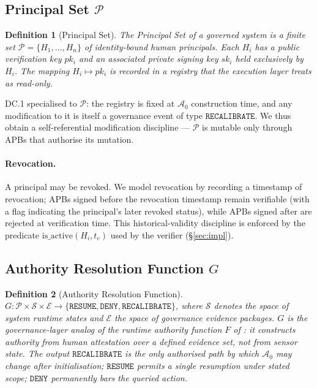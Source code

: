 \documentclass[11pt]{article}
\newtheorem{definition}{Definition}[section]
\newcommand{\Azero}{\mathcal{A}_0}
\newcommand{\RESUME}{\texttt{RESUME}}
\newcommand{\DENY}{\texttt{DENY}}
\newcommand{\RECAL}{\texttt{RECALIBRATE}}
\newcommand{\Pset}{\mathcal{P}}
\newcommand{\Hi}{H_i}
\newcommand{\ski}{sk_i}
\newcommand{\pki}{pk_i}
\begin{document}
\subsection{Principal Set $\Pset$}
\label{sec:principals}

\begin{definition}[Principal Set]
\label{def:principals}
The \emph{Principal Set} of a governed system is a finite set
$\Pset = \{H_1, \ldots, H_n\}$ of identity-bound human principals.
Each $\Hi$ has a public verification key $\pki$ and an associated
private signing key $\ski$ held exclusively by $\Hi$. The mapping
$H_i \mapsto \pki$ is recorded in a registry that the execution layer
treats as read-only.
\end{definition}

DC.1 specialised to $\Pset$: the registry is fixed at $\Azero$
construction time, and any modification to it is itself a governance
event of type $\RECAL$. We thus obtain a self-referential modification
discipline --- $\Pset$ is mutable only through APBs that authorise
its mutation.

\paragraph{Revocation.}
A principal may be revoked. We model revocation by recording a
timestamp of revocation; APBs signed before the revocation timestamp
remain verifiable (with a flag indicating the principal's later
revoked status), while APBs signed after are rejected at verification
time. This historical-validity discipline is enforced by the
predicate $\mathrm{is\_active}(\Hi, t_e)$ used by the verifier
(\S\ref{sec:impl}).

\subsection{Authority Resolution Function $G$}
\label{sec:G}

\begin{definition}[Authority Resolution Function]
\label{def:G}
$G : \Pset \times \mathcal{S} \times \mathcal{E}
   \to \{\RESUME, \DENY, \RECAL\}$,
where $\mathcal{S}$ denotes the space of system runtime states and
$\mathcal{E}$ the space of governance evidence packages. $G$ is the
governance-layer analog of the runtime authority function $F$ of
\citep{fernandez2026applied}: it constructs authority from human
attestation over a defined evidence set, not from sensor state.
The output $\RECAL$ is the only authorised path by which $\Azero$
may change after initialisation; $\RESUME$ permits a single
resumption under stated scope; $\DENY$ permanently bars the queried
action.
\end{definition}
\end{document}

